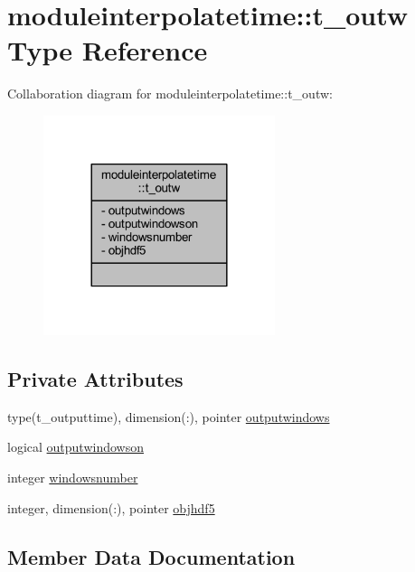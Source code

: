 \hypertarget{structmoduleinterpolatetime_1_1t__outw}{}\section{moduleinterpolatetime\+:\+:t\+\_\+outw Type Reference}
\label{structmoduleinterpolatetime_1_1t__outw}


Collaboration diagram for moduleinterpolatetime\+:\+:t\+\_\+outw\+:\nopagebreak
\begin{figure}[H]
\begin{center}
\leavevmode
\includegraphics[width=192pt]{structmoduleinterpolatetime_1_1t__outw__coll__graph}
\end{center}
\end{figure}
\subsection*{Private Attributes}
\begin{DoxyCompactItemize}
\item 
type(t\+\_\+outputtime), dimension(\+:), pointer \mbox{\hyperlink{structmoduleinterpolatetime_1_1t__outw_a4f1816ce12ad737701c7a1ffc3597344}{outputwindows}}
\item 
logical \mbox{\hyperlink{structmoduleinterpolatetime_1_1t__outw_a017a0fb8a13f35836ae20eddbbf1a24a}{outputwindowson}}
\item 
integer \mbox{\hyperlink{structmoduleinterpolatetime_1_1t__outw_a64fb95d37653756d6c726f3da6ae633e}{windowsnumber}}
\item 
integer, dimension(\+:), pointer \mbox{\hyperlink{structmoduleinterpolatetime_1_1t__outw_aa8377bc0314333d53c562542880cf845}{objhdf5}}
\end{DoxyCompactItemize}


\subsection{Member Data Documentation}
\mbox{\label{structmoduleinterpolatetime_1_1t__outw_aa8377bc0314333d53c562542880cf845}} 
